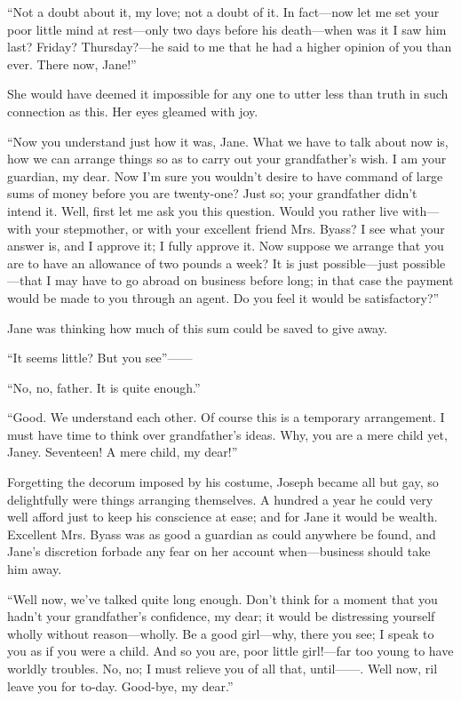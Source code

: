 ``Not a doubt about it, my love; not a doubt of it. In fact---now let me
set your poor little mind at rest---only two days before his
death---when was it I saw him last? Friday? Thursday?---he said to me
that he had a higher opinion of you than ever. There now, Jane!''

She would have deemed it impossible for any one to utter less than truth
in such connection as this. Her eyes gleamed with joy.

``Now you understand just how it was, Jane. What we have to talk about
now is, how we can arrange things so as to carry out your grandfather's
wish. I am your guardian, my dear. Now I'm sure you wouldn't desire to
have command of large sums of money before you are twenty-one? Just so;
your {\protect\hypertarget{233}{}{}}grandfather didn't intend it. Well,
first let me ask you this question. Would you rather live with---with
your stepmother, or with your excellent friend Mrs. Byass? I see what
your answer is, and I approve it; I fully approve it. Now suppose we
arrange that you are to have an allowance of two pounds a week? It is
just possible---just possible---that I may have to go abroad on business
before long; in that case the payment would be made to you through an
agent. Do you feel it would be satisfactory?''

Jane was thinking how much of this sum could be saved to give away.

``It seems little? But you see''{{------}}

``No, no, father. It is quite enough.''

``Good. We understand each other. Of course this is a temporary
arrangement. I must have time to think over grandfather's ideas. Why,
you are a mere child yet, Janey. Seventeen! A mere child, my dear!''

Forgetting the decorum imposed by his costume, Joseph became all but
gay, so delightfully were things arranging themselves. A hundred a year
he could very well afford just to keep his conscience at ease; and for
Jane {\protect\hypertarget{234}{}{}}it would be wealth. Excellent Mrs.
Byass was as good a guardian as could anywhere be found, and Jane's
discretion forbade any fear on her account when---business should take
him away.

``Well now, we've talked quite long enough. Don't think for a moment
that you hadn't your grandfather's confidence, my dear; it would be
distressing yourself wholly without reason---wholly. Be a good
girl---why, there you see; I speak to you as if you were a child. And so
you are, poor little girl!---far too young to have worldly troubles. No,
no; I must relieve you of all that, until{{------}}. Well now, ril leave
you for to-day. Good-bye, my dear.''

